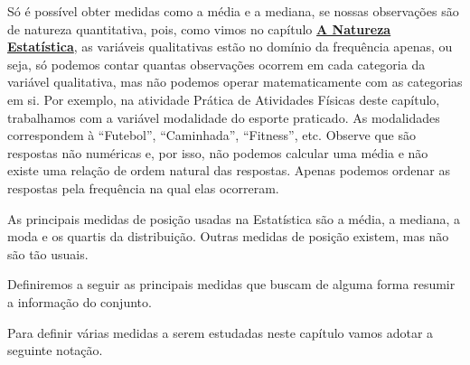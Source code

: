 Só é possível obter medidas como a média e a mediana, se nossas observações são de natureza quantitativa, pois, como vimos no capítulo
\textbf{\hyperref[est1-chap]{A Natureza Estatística}}, as variáveis qualitativas estão no domínio da frequência apenas, ou seja, só podemos contar quantas observações ocorrem em cada categoria da variável qualitativa, mas não podemos operar matematicamente com as categorias em si. Por exemplo, na atividade Prática de Atividades Físicas deste capítulo, trabalhamos com a variável modalidade do esporte praticado. As modalidades correspondem à “Futebol”, “Caminhada”, “Fitness”, etc. Observe que são respostas não numéricas e, por isso, não podemos calcular uma média e não existe uma relação de ordem natural das respostas. Apenas podemos ordenar as respostas pela frequência na qual elas ocorreram.

As principais medidas de posição usadas na Estatística são a média, a mediana, a moda e os quartis da distribuição. Outras medidas de posição existem, mas não são tão usuais.

Definiremos a seguir as principais medidas que buscam de alguma forma resumir a informação do conjunto.

Para definir várias medidas a serem estudadas neste capítulo vamos adotar a seguinte notação.

